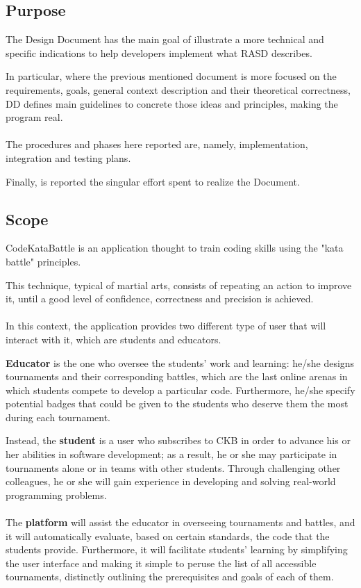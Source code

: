 \subsection{Purpose}
The Design Document has the main goal of illustrate a more technical and specific indications to help developers implement what RASD describes.

In particular, where the previous mentioned document is more focused on the requirements, goals, general context description and their theoretical correctness, DD defines main guidelines to concrete those ideas and principles, 
making the program real.\\
\\
The procedures and phases here reported are, namely, implementation, integration and testing plans.

Finally, is reported the singular effort spent to realize the Document.

\subsection{Scope}
CodeKataBattle is an application thought to train coding skills using the "kata battle" principles. 

This technique, typical of martial arts, consists of repeating an action to improve it, until a good level of confidence, correctness and precision is achieved.\\
\\
In this context, the application provides two different type of user that will interact with it, which are students and educators.

\textbf{Educator} is the one who oversee the students' work and learning: he/she designs tournaments and their corresponding battles, which are the last online arenas in which students compete to develop a particular code. Furthermore, 
he/she specify potential badges that could be given to the students who deserve them the most during each tournament.

Instead, the \textbf{student} is a user who subscribes to CKB in order to advance his or her abilities in software development; as a result, he or she may participate in tournaments alone or in teams with other students. Through challenging 
other colleagues, he or she will gain experience in developing and solving real-world programming problems.\\
\\
The \textbf{platform} will assist the educator in overseeing tournaments and battles, and it will automatically evaluate, based on certain standards, the code that the students provide. Furthermore, it will facilitate students' learning by 
simplifying the user interface and making it simple to peruse the list of all accessible tournaments, distinctly outlining the prerequisites and goals of each of them.\\

